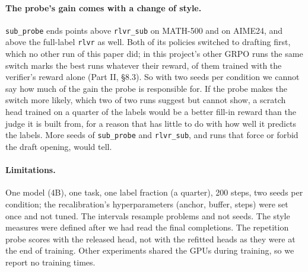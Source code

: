 \paragraph{The probe's gain comes with a change of style.} \texttt{sub\_probe} ends  points above
\texttt{rlvr\_sub} on MATH-500 and  on AIME24, and above the full-label \texttt{rlvr} as well.
Both of its policies switched to drafting first, which no other run of this paper did; in this project's other GRPO
runs the same switch marks the best runs whatever their reward,  of them trained with the
verifier's reward alone (Part II, \S8.3). So with two seeds per condition we cannot say how much of the gain the probe is responsible for. If
the probe makes the switch more likely, which two of two runs suggest but cannot show, a scratch head trained on a
quarter of the labels would be a better fill-in reward than the judge it is built from, for a reason that has little
to do with how well it predicts the labels. More seeds of \texttt{sub\_probe} and \texttt{rlvr\_sub}, and runs that
force or forbid the draft opening, would tell.

\paragraph{Limitations.} One model (4B), one task, one label fraction (a quarter), 200 steps, two seeds per condition;
the recalibration's hyperparameters (anchor, buffer, steps) were set once and not tuned. The intervals resample
problems and not seeds. The style measures were defined after we had read the final completions. The repetition probe
scores with the released head, not with the refitted heads as they were at the end of training. Other experiments
shared the GPUs during training, so we report no training times.
